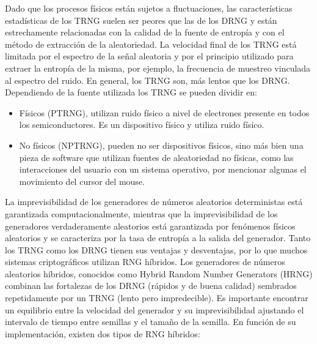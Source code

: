 \begin{enumerate}
                Dado que los procesos físicos están sujetos a fluctuaciones, las características estadísticas de los TRNG suelen ser peores que las de los DRNG y están estrechamente relacionadas con la calidad de la fuente de entropía y con el método de extracción de la aleatoriedad. La velocidad final de los TRNG está limitada por el espectro de la señal aleatoria y por el principio utilizado para extraer la entropía de la misma, por ejemplo, la frecuencia de muestreo vinculada al espectro del ruido. En general, los TRNG son, más lentos que los DRNG. Dependiendo de la fuente utilizada los TRNG se pueden dividir en:
            
            \begin{itemize}
                \item Físicos (PTRNG), utilizan ruido físico a nivel de electrones presente en todos los semiconductores. Es un dispositivo físico y utiliza ruido físico.
                \item No físicos (NPTRNG), pueden no ser dispositivos físicos, sino más bien una pieza de software que utilizan fuentes de aleatoriedad no físicas, como las interacciones del usuario con un sistema operativo, por mencionar algunas el movimiento del cursor del mouse.
            \end{itemize}
        \end{enumerate}
	
        La imprevisibilidad de los generadores de números aleatorios deterministas está garantizada computacionalmente, mientras que la imprevisibilidad de los generadores verdaderamente aleatorios está garantizada por fenómenos físicos aleatorios y se caracteriza por la tasa de entropía a la salida del generador. Tanto los TRNG como los DRNG tienen sus ventajas y desventajas, por lo que muchos sistemas criptográficos utilizan RNG híbridos. Los generadores de números aleatorios híbridos, conocidos como Hybrid Random Number Generators (HRNG) combinan las fortalezas de los DRNG (rápidos y de buena calidad) sembrados repetidamente por un TRNG (lento pero impredecible). Es importante encontrar un equilibrio entre la velocidad del generador y su imprevisibilidad ajustando el intervalo de tiempo entre semillas y el tamaño de la semilla. En función de su implementación, existen dos tipos de RNG híbridos:
	
